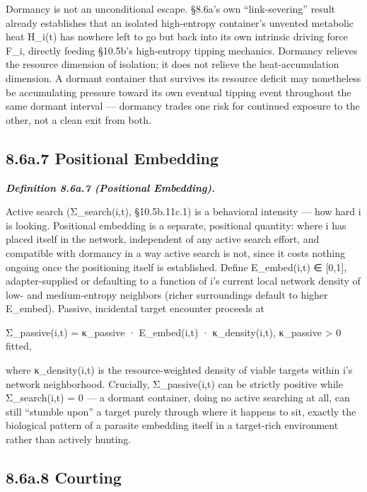 \documentclass[
]{article}
\begin{document}
Dormancy is not an unconditional escape. §8.6a's own ``link-severing''
result already establishes that an isolated high-entropy container's
unvented metabolic heat H\_i(t) has nowhere left to go but back into its
own intrinsic driving force F\_i, directly feeding §10.5b's high-entropy
tipping mechanics. Dormancy relieves the resource dimension of
isolation; it does not relieve the heat-accumulation dimension. A
dormant container that survives its resource deficit may nonetheless be
accumulating pressure toward its own eventual tipping event throughout
the same dormant interval --- dormancy trades one risk for continued
exposure to the other, not a clean exit from both.

\hypertarget{a.7-positional-embedding}{%
\subsection{8.6a.7 Positional
Embedding}\label{a.7-positional-embedding}}

\emph{\textbf{Definition 8.6a.7 (Positional Embedding).}}

Active search (Σ\_search(i,t), §10.5b.11c.1) is a behavioral intensity
--- how hard i is looking. Positional embedding is a separate,
positional quantity: where i has placed itself in the network,
independent of any active search effort, and compatible with dormancy in
a way active search is not, since it costs nothing ongoing once the
positioning itself is established. Define E\_embed(i,t) ∈ {[}0,1{]},
adapter-supplied or defaulting to a function of i's current local
network density of low- and medium-entropy neighbors (richer
surroundings default to higher E\_embed). Passive, incidental target
encounter proceeds at

Σ\_passive(i,t) = κ\_passive · E\_embed(i,t) · κ\_density(i,t),
κ\_passive \textgreater{} 0 fitted,

where κ\_density(i,t) is the resource-weighted density of viable targets
within i's network neighborhood. Crucially, Σ\_passive(i,t) can be
strictly positive while Σ\_search(i,t) = 0 --- a dormant container,
doing no active searching at all, can still ``stumble upon'' a target
purely through where it happens to sit, exactly the biological pattern
of a parasite embedding itself in a target-rich environment rather than
actively hunting.

\hypertarget{a.8-courting}{%
\subsection{8.6a.8 Courting}\label{a.8-courting}}
\end{document}
